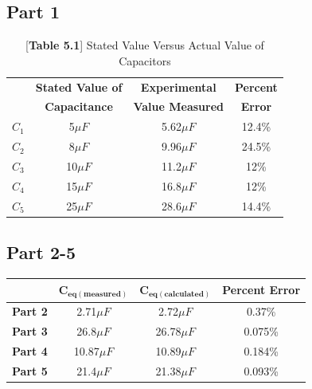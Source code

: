 \documentclass[titlepage]{article}
\begin{document}
	    \subsection{Part 1}
        \FloatBarrier
		\begin{table}[hbt!]
			\centering
			\caption*{[\textbf{Table 5.1}] Stated Value Versus Actual Value of Capacitors}
			\begin{tabular}{c|c|c|c}
				&\textbf{Stated Value of} &\textbf{Experimental} &\textbf{Percent}\\
				& \textbf{Capacitance} & \textbf{Value Measured} & \textbf{Error}\\
				\hline
			$C_1$ & 5$\mu F$ & 5.62$\mu F$ & 12.4\% \\ 
			$C_2$ & 8$\mu F$ & 9.96$\mu F$ & 24.5\% \\ 
			$C_3$ & 10$\mu F$ & 11.2$\mu F$ & 12\% \\ 
			$C_4$ & 15$\mu F$ & 16.8$\mu F$ & 12\% \\ 
			$C_5$ & 25$\mu F$ & 28.6$\mu F$ & 14.4\% \\ 
			\end{tabular}
		\end{table}
        \FloatBarrier

	    \subsection{Part 2-5} 
		\begin{table}[hbt!]
			\centering
			\begin{tabular}{c|c|c|c}
				& $\bm{C_{eq(measured)}}$ & $\bm{C_{eq(calculated)}}$ & \textbf{Percent Error} \\
				\hline
				\textbf{Part 2} &2.71$\mu F$ &2.72$\mu F$ &0.37\% \\
				\textbf{Part 3} &26.8$\mu F$ &26.78$\mu F$ &0.075\% \\
				\textbf{Part 4} &10.87$\mu F$ &10.89$\mu F$ &0.184\% \\
				\textbf{Part 5} &21.4$\mu F$ &21.38$\mu F$ &0.093\% 
			\end{tabular}
		\end{table}
\end{document}
